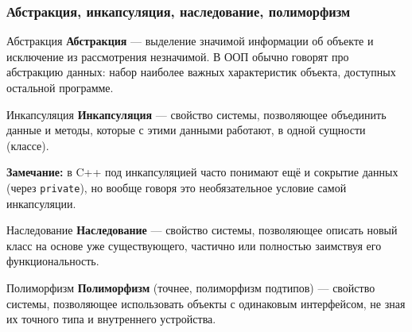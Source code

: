 \subsubsection{Абстракция, инкапсуляция, наследование, полиморфизм}
\begin{definition}{Абстракция}{}
\textbf{Абстракция} --- выделение значимой информации об объекте и исключение из рассмотрения незначимой. В ООП обычно говорят про абстракцию данных: набор наиболее важных характеристик объекта, доступных остальной программе.
\end{definition}
\begin{definition}{Инкапсуляция}{}
\textbf{Инкапсуляция} --- свойство системы, позволяющее объединить данные и методы, которые с этими данными работают, в одной сущности (классе).
\end{definition}
\textbf{Замечание:} в C++ под инкапсуляцией часто понимают ещё и сокрытие данных (через \texttt{private}), но вообще говоря это необязательное условие самой инкапсуляции.
\begin{definition}{Наследование}{}
\textbf{Наследование} --- свойство системы, позволяющее описать новый класс на основе уже существующего, частично или полностью заимствуя его функциональность.
\end{definition}
\begin{definition}{Полиморфизм}{}
\textbf{Полиморфизм} (точнее, полиморфизм подтипов) --- свойство системы, позволяющее использовать объекты с одинаковым интерфейсом, не зная их точного типа и внутреннего устройства.
\end{definition}
